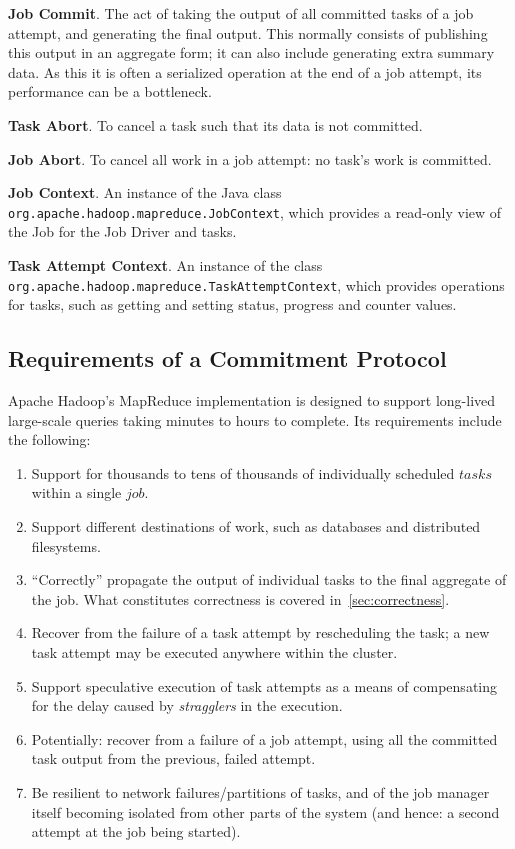 \documentclass[conference]{IEEEtran}
\begin{document}
\textbf{Job Commit}.
The act of taking the output of all committed tasks of a job attempt,
and generating the final output.
This normally consists of publishing this output in an aggregate form;
it can also include generating extra summary data.
As this it is often a serialized operation at the end of a job attempt,
its performance can be a bottleneck.

\textbf{Task Abort}.
To cancel a task such that its data is not committed.

\textbf{Job Abort}.
To cancel all work in a job attempt: no task's work is committed.


\textbf{Job Context}.
An instance of the Java class \texttt{org.apache.hadoop.mapreduce.JobContext},
which provides a read-only view of the Job for the Job Driver and tasks.

\textbf{Task Attempt Context}.
An instance of the class
\texttt{org.apache.hadoop.mapreduce.TaskAttemptContext},
which provides operations for tasks, such as getting and setting status,
progress and counter values.


\subsection{Requirements of a Commitment Protocol}
\label{subsec:commit-protocol-requirements}

Apache Hadoop's MapReduce implementation is designed to support long-lived
large-scale queries taking minutes to hours to complete.
Its requirements include the following:

\begin{enumerate}

  \item Support for thousands to tens of thousands of individually scheduled $tasks$
  within a single $job$.

  \item Support different destinations of work, such as databases and
  distributed filesystems.

  \item ``Correctly'' propagate the output of individual tasks to the final
  aggregate of the job.
  What constitutes correctness is covered in\ \ref{sec:correctness}.

  \item Recover from the failure of a task attempt by rescheduling the task;
  a new task attempt may be executed anywhere within the cluster.

  \item Support speculative execution of task attempts as a means of compensating for the
  delay caused by \emph{stragglers} in the execution.

  \item Potentially: recover from a failure of a job attempt, using all the committed
  task output from the previous, failed attempt.

  \item Be resilient to network failures/partitions of tasks, and of the job manager
  itself becoming isolated from other parts of the system (and hence: a second
  attempt at the job being started).

\end{enumerate}
\end{document}

